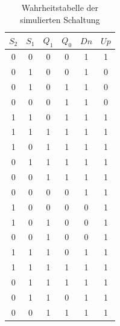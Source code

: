 \documentclass[
    paper=a4,
]{scrartcl}
\begin{document}
    \begin{table}
        \centering
        \caption{Wahrheitstabelle der simulierten Schaltung}
        \label{tab:8}
        \begin{tabular}{cccc|cc}\toprule
            $S_2$   &   $S_1$   &   $Q_1$   &   $Q_0$   &   $Dn$    &   $Up$\\\midrule
            0       &   0       &   0       &   0       &   1       &   1\\
            0       &   1       &   0       &   0       &   1       &   0\\
            0       &   1       &   0       &   1       &   1       &   0\\
            0       &   0       &   0       &   1       &   1       &   0\\
            1       &   1       &   0       &   1       &   1       &   1\\
            1       &   1       &   1       &   1       &   1       &   1\\
            1       &   0       &   1       &   1       &   1       &   1\\
            0       &   1       &   1       &   1       &   1       &   1\\
            0       &   0       &   1       &   1       &   1       &   1\\\midrule
            0       &   0       &   0       &   0       &   1       &   1\\
            1       &   0       &   0       &   0       &   0       &   1\\
            1       &   0       &   1       &   0       &   0       &   1\\
            0       &   0       &   1       &   0       &   0       &   1\\
            1       &   1       &   1       &   0       &   1       &   1\\
            1       &   1       &   1       &   1       &   1       &   1\\
            0       &   1       &   1       &   1       &   1       &   1\\
            0       &   1       &   1       &   0       &   1       &   1\\
            0       &   0       &   1       &   1       &   1       &   1\\\bottomrule
        \end{tabular}
    \end{table}
\end{document}
